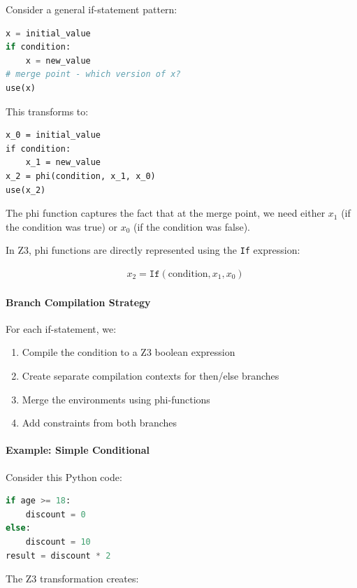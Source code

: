 Consider a general if-statement pattern:
\begin{lstlisting}[language=Python, numbers=none]
x = initial_value
if condition:
    x = new_value
# merge point - which version of x?
use(x)
\end{lstlisting}

This transforms to:
\begin{lstlisting}[numbers=none]
x_0 = initial_value
if condition:
    x_1 = new_value
x_2 = phi(condition, x_1, x_0)
use(x_2)
\end{lstlisting}

The phi function captures the fact that at the merge point, we need either $x_1$ (if the condition was true) or $x_0$ (if the condition was false).

In Z3, phi functions are directly represented using the \texttt{If} expression:

\begin{align*}
& x_2 = \texttt{If}(\text{condition}, x_1, x_0)
\end{align*}

\paragraph{Branch Compilation Strategy}

For each if-statement, we:
\begin{enumerate}
    \item Compile the condition to a Z3 boolean expression
    \item Create separate compilation contexts for then/else branches
    \item Merge the environments using phi-functions
    \item Add constraints from both branches
\end{enumerate}

\paragraph{Example: Simple Conditional}

Consider this Python code:

\begin{lstlisting}[language=Python, numbers=none, caption={Python conditional statement}]
if age >= 18:
    discount = 0
else:
    discount = 10
result = discount * 2
\end{lstlisting}

The Z3 transformation creates:

